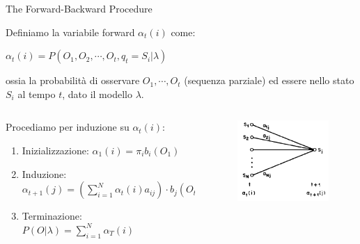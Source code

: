 \documentclass[mathserif]{beamer}
\begin{document}
\begin{frame}{The Forward-Backward Procedure}
 \begin{block}{}
  Definiamo la variabile forward $\alpha_{t}(i)$ come:
	\begin{center}
	$\alpha_{t}(i) = P(O_{1}, O_{2}, \cdots, O_{t}, q_{t} = S_{i}|\lambda)$
	\end{center}
ossia la probabilit\`a di osservare $O_{1}, \cdots, O_{t}$ (sequenza parziale) ed essere nello stato $S_{i}$ al tempo $t$, dato il modello $\lambda$.
 \end{block}
 \begin{block}{}
 \begin{columns}[c]
   \begin{column}[t]{8.5cm}
	Procediamo per induzione su $\alpha_{t}(i)$:
	\begin{enumerate}
 	\item Inizializzazione: $\alpha_{1}(i) = \pi_{i}b_{i}(O_{1})$
	\item Induzione: $\alpha_{t+1}(j) = (\sum_{i = 1}^{N} \alpha_{t}(i)a_{ij}) \cdot b_{j}(O_{t+1})$
	\item Terminazione: $P(O|\lambda) = \sum_{i=1}^{N}\alpha_{T}(i)$
	\end{enumerate}
    
   \end{column}
   \begin{column}[T]{1.5cm}
	\begin{figure}[l]
	\centering
	\includegraphics[scale=0.25]{alpha.png}
	\label{fig:alpha}
 \end{figure}
    
   \end{column}

 \end{columns}

  

 \end{block}


\end{frame}
\end{document}
